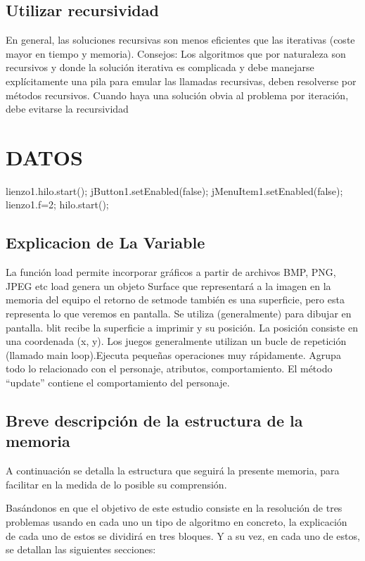 \documentclass[letterpaper, 10 pt, conference]{ieeeconf}  %
\begin{document}
\subsection{Utilizar recursividad}

En general, las soluciones recursivas son menos eficientes que las iterativas (coste mayor en tiempo y memoria).
Consejos:
Los algoritmos que por naturaleza son recursivos y donde la solución iterativa es complicada y debe manejarse explícitamente una pila para emular las llamadas recursivas, deben resolverse por métodos recursivos.
Cuando haya una solución obvia al problema por iteración, debe evitarse la recursividad

\section{DATOS}

lienzo1.hilo.start(); jButton1.setEnabled(false); jMenuItem1.setEnabled(false); lienzo1.f=2; hilo.start();


\subsection{Explicacion de La Variable}La función load permite incorporar gráficos a partir de archivos BMP, PNG, JPEG etc load genera un objeto  Surface que 
representará a la imagen en la memoria del equipo el retorno de  setmode también es una superficie, pero esta representa lo que veremos en pantalla. Se utiliza (generalmente) para dibujar en pantalla. blit recibe la superficie a imprimir y su posición. La posición consiste en una coordenada (x, y).
Los juegos generalmente utilizan un bucle de repetición (llamado main loop).Ejecuta pequeñas operaciones muy rápidamente. Agrupa todo lo relacionado con el personaje, atributos, comportamiento. El método “update” contiene el comportamiento del personaje.

\subsection{Breve descripción de la estructura de la memoria} A continuación se detalla la estructura que seguirá la presente memoria, para facilitar en la medida de lo posible su comprensión.

Basándonos en que el objetivo de este estudio consiste en la resolución de tres problemas usando en cada uno un tipo de algoritmo en concreto, la explicación de cada uno de estos se dividirá en tres bloques. Y a su vez, en cada uno de estos, se detallan las siguientes secciones:
\end{document}

